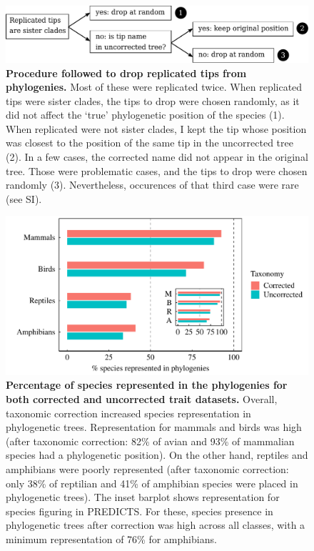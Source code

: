 \begin{figure}[h!]
\centering
\includegraphics[scale=0.7]{figures/chapter2/chart_phylorep}
\caption[Procedure followed to drop replicated tips from phylogenies]{\textbf{Procedure followed to drop replicated tips from phylogenies.} Most of these were replicated twice. When replicated tips were sister clades, the tips to drop were chosen randomly, as it did not affect the `true' phylogenetic position of the species (1). When replicated were not sister clades, I kept the tip whose position was closest to the position of the same tip in the uncorrected tree (2). In a few cases, the corrected name did not appear in the original tree. Those were problematic cases, and the tips to drop were chosen randomly (3). Nevertheless, occurences of that third case were rare (see SI).}
\label{chart_phylorep}
\end{figure}

\begin{figure}[h!]
\centering
\includegraphics[scale=0.7]{figures/chapter2/Species_representation_phylo}
\caption[Percentage of species represented in the phylogenies for both corrected and uncorrected trait datasets]{\textbf{Percentage of species represented in the phylogenies for both corrected and uncorrected trait datasets.} Overall, taxonomic correction increased species representation in phylogenetic trees. Representation for mammals and birds was high (after taxonomic correction: 82\% of avian and 93\% of mammalian species had a phylogenetic position). On the other hand, reptiles and amphibians were poorly represented (after taxonomic correction: only 38\% of reptilian and 41\% of amphibian species were placed in phylogenetic trees). The inset barplot shows representation for species figuring in PREDICTS. For these, species presence in phylogenetic trees after correction was high across all classes, with a minimum representation of 76\% for amphibians.}
\label{species_rep_phylo}
\end{figure}

